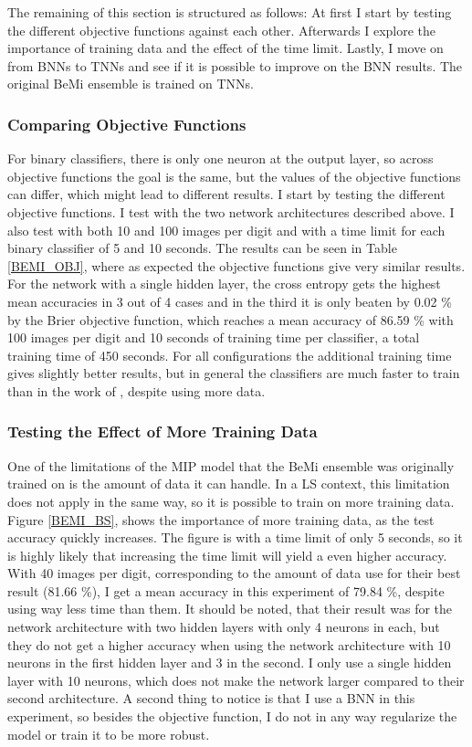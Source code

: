 \noindent The remaining of this section is structured as follows: At first I start by testing the different objective functions against each other. Afterwards I explore the importance of training data and the effect of the time limit. Lastly, I move on from BNNs to TNNs and see if it is possible to improve on the BNN results. The original BeMi ensemble is trained on TNNs. 

\subsubsection{Comparing Objective Functions} 
For binary classifiers, there is only one neuron at the output layer, so across objective functions the goal is the same, but the values of the objective functions can differ, which might lead to different results. I start by testing the different objective functions. I test with the two network architectures described above. I also test with both 10 and 100 images per digit and with a time limit for each binary classifier of 5 and 10 seconds. The results can be seen in Table \ref{BEMI_OBJ}, where as expected the objective functions give very similar results. For the network with a single hidden layer, the cross entropy gets the highest mean accuracies in 3 out of 4 cases and in the third it is only beaten by 0.02 \% by the Brier objective function, which reaches a mean accuracy of 86.59 \% with 100 images per digit and 10 seconds of training time per classifier, a total training time of 450 seconds. For all configurations the additional training time gives slightly better results, but in general the classifiers are much faster to train than in the work of \cite{ambrogio2023}, despite using more data. 



\subsubsection{Testing the Effect of More Training Data}
One of the limitations of the MIP model that the BeMi ensemble was originally trained on is the amount of data it can handle. In a LS context, this limitation does not apply in the same way, so it is possible to train on more training data. Figure \ref{BEMI_BS}, shows the importance of more training data, as the test accuracy quickly increases. The figure is with a time limit of only 5 seconds, so it is highly likely that increasing the time limit will yield a even higher accuracy. With 40 images per digit, corresponding to the amount of data \cite{ambrogio2023} use for their best result (81.66 \%), I get a mean accuracy in this experiment of 79.84 \%, despite using way less time than them. It should be noted, that their result was for the network architecture with two hidden layers with only 4 neurons in each, but they do not get a higher accuracy when using the network architecture with 10 neurons in the first hidden layer and 3 in the second. I only use a single hidden layer with 10 neurons, which does not make the network larger compared to their second architecture. A second thing to notice is that I use a BNN in this experiment, so besides the objective function, I do not in any way regularize the model or train it to be more robust. 

